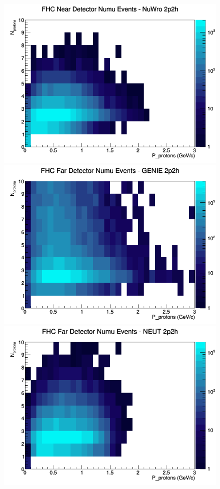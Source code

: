 \begin{figure}[h]
\includegraphics[width=\linewidth]{N_P/nominal/protons/2p2h_FHC_ND_numu_N_P_NuWro.png}
\endminipage
\newline
{}
\includegraphics[width=\linewidth]{N_P/nominal/protons/2p2h_FHC_FD_numu_N_P_GENIE.png}
\endminipage
{}
\includegraphics[width=\linewidth]{N_P/nominal/protons/2p2h_FHC_FD_numu_N_P_NEUT.png}

\end{figure}

